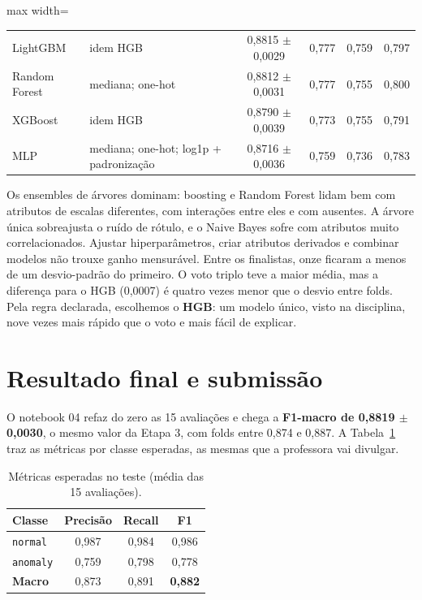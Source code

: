 \documentclass[11pt,a4paper]{article}
\begin{document}
\begin{table}[H]
\begin{adjustbox}{max width=\linewidth}
\begin{tabular}{llcccc}
LightGBM & idem HGB & 0,8815 $\pm$ 0,0029 & 0,777 & 0,759 & 0,797 \\
Random Forest & mediana; one-hot & 0,8812 $\pm$ 0,0031 & 0,777 & 0,755 & 0,800 \\
XGBoost & idem HGB & 0,8790 $\pm$ 0,0039 & 0,773 & 0,755 & 0,791 \\
MLP & mediana; one-hot; log1p + padronização & 0,8716 $\pm$ 0,0036 & 0,759 & 0,736 & 0,783 \\
\bottomrule
\end{tabular}
\end{adjustbox}
\end{table}

Os ensembles de árvores dominam: boosting e Random Forest lidam bem com atributos de escalas diferentes, com interações entre eles e com ausentes. A árvore única sobreajusta o ruído de rótulo, e o Naive Bayes sofre com atributos muito correlacionados. Ajustar hiperparâmetros, criar atributos derivados e combinar modelos não trouxe ganho mensurável. Entre os finalistas, onze ficaram a menos de um desvio-padrão do primeiro. O voto triplo teve a maior média, mas a diferença para o HGB (0,0007) é quatro vezes menor que o desvio entre folds. Pela regra declarada, escolhemos o \textbf{HGB}: um modelo único, visto na disciplina, nove vezes mais rápido que o voto e mais fácil de explicar.

\section{Resultado final e submissão}
\label{sec:resultado}

O notebook 04 refaz do zero as 15 avaliações e chega a \textbf{F1-macro de 0,8819 $\pm$ 0,0030}, o mesmo valor da Etapa 3, com folds entre 0,874 e 0,887. A Tabela~\ref{tab:classes} traz as métricas por classe esperadas, as mesmas que a professora vai divulgar.

\begin{table}[H]
\centering
\caption{Métricas esperadas no teste (média das 15 avaliações).}
\label{tab:classes}
\small
\begin{tabular}{lccc}
\toprule
Classe & Precisão & Recall & F1 \\
\midrule
\texttt{normal} & 0,987 & 0,984 & 0,986 \\
\texttt{anomaly} & 0,759 & 0,798 & 0,778 \\
\textbf{Macro} & 0,873 & 0,891 & \textbf{0,882} \\
\bottomrule
\end{tabular}
\end{table}
\end{document}
